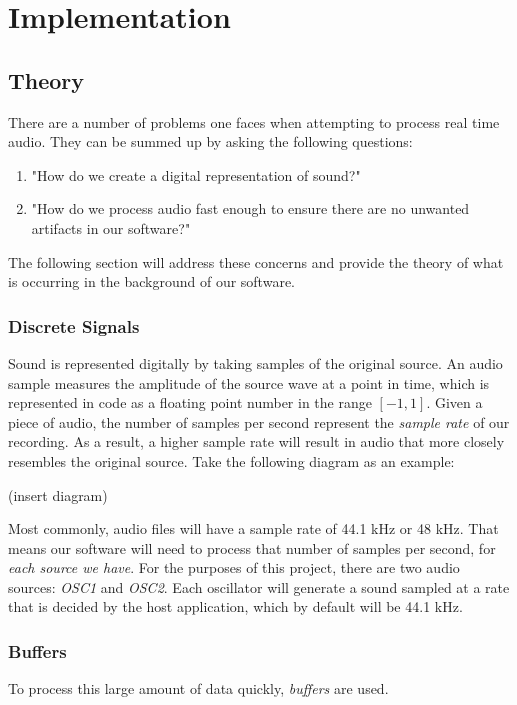 \documentclass[12pt]{article}
\begin{document}
\section{Implementation}

\subsection{Theory}
There are a number of problems one faces when attempting to process real time audio. They can be summed up by asking the following questions:

\begin{enumerate}
	\item "How do we create a digital representation of sound?"
	\item "How do we process audio fast enough to ensure there are no unwanted artifacts in our software?"
\end{enumerate}

The following section will address these concerns and provide the theory of what is occurring in the background of our software.

\subsubsection{Discrete Signals}
Sound is represented digitally by taking samples of the original source. An audio sample measures the amplitude of the source wave at a point in time, which is represented in code as a floating point number in the range \([-1, 1]\). Given a piece of audio, the number of samples per second represent the \textit{sample rate} of our recording. As a result, a higher sample rate will result in audio that more closely resembles the original source. Take the following diagram as an example:

(insert diagram)

Most commonly, audio files will have a sample rate of 44.1 kHz or 48 kHz. That means our software will need to process that number of samples per second, for \textit{each source we have}. For the purposes of this project, there are two audio sources: \textit{OSC1} and \textit{OSC2}. Each oscillator will generate a sound sampled at a rate that is decided by the host application, which by default will be 44.1 kHz.

\subsubsection{Buffers}
To process this large amount of data quickly, \textit{buffers} are used.
\end{document}
